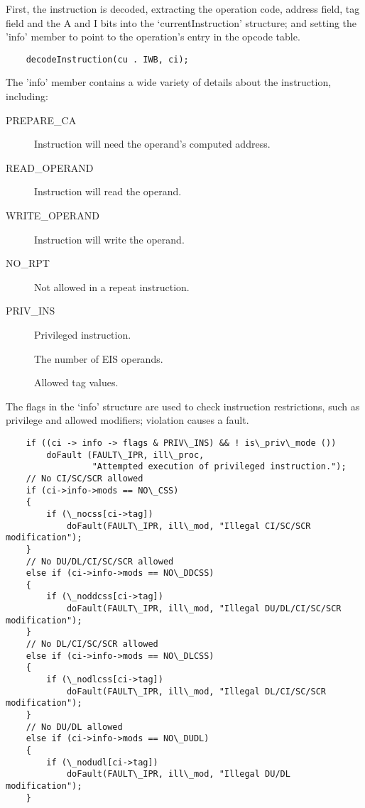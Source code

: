 \documentclass[notitlepage]{report}
\begin{document}
First, the instruction is decoded, extracting the operation code, address
field, tag field and the A and I bits into the `currentInstruction'
structure; and setting the 'info' member to point to the operation's
entry in the opcode table.

\begin{verbatim}
    decodeInstruction(cu . IWB, ci);
\end{verbatim}

The 'info' member contains a wide variety of details about the instruction,
including:

\begin{description}
\item [PREPARE\_CA] Instruction will need the operand's computed address.
\item [READ\_OPERAND] Instruction will read the operand.
\item [WRITE\_OPERAND] Instruction will write the operand.
\item [NO\_RPT] Not allowed in a repeat instruction.
\item [PRIV\_INS] Privileged instruction.
\item [] The number of EIS operands.
\item [] Allowed tag values.
\end{description}

The flags in the `info' structure are used to check instruction restrictions, 
such as privilege and allowed modifiers; violation causes a fault.

\begin{verbatim}
    if ((ci -> info -> flags & PRIV\_INS) && ! is\_priv\_mode ())
        doFault (FAULT\_IPR, ill\_proc, 
                 "Attempted execution of privileged instruction.");
    // No CI/SC/SCR allowed
    if (ci->info->mods == NO\_CSS)
    {
        if (\_nocss[ci->tag])
            doFault(FAULT\_IPR, ill\_mod, "Illegal CI/SC/SCR modification");
    }
    // No DU/DL/CI/SC/SCR allowed
    else if (ci->info->mods == NO\_DDCSS)
    {
        if (\_noddcss[ci->tag])
            doFault(FAULT\_IPR, ill\_mod, "Illegal DU/DL/CI/SC/SCR modification");
    }
    // No DL/CI/SC/SCR allowed
    else if (ci->info->mods == NO\_DLCSS)
    {
        if (\_nodlcss[ci->tag])
            doFault(FAULT\_IPR, ill\_mod, "Illegal DL/CI/SC/SCR modification");
    }
    // No DU/DL allowed
    else if (ci->info->mods == NO\_DUDL)
    {
        if (\_nodudl[ci->tag])
            doFault(FAULT\_IPR, ill\_mod, "Illegal DU/DL modification");
    }
\end{verbatim}
\end{document}
